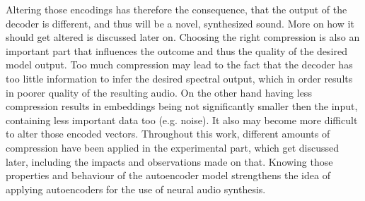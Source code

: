 Altering those encodings has therefore the consequence, that the output of the decoder is different, and thus will be a novel, synthesized sound. More on how it should get altered is discussed later on.
Choosing the right compression is also an important part that influences the outcome and thus the quality of the desired model output. Too much compression may lead to the fact that the decoder has too little information to infer the desired spectral output, which in order results in poorer quality of the resulting audio. On the other hand having less compression results in embeddings being not significantly smaller then the input, containing less important data too (e.g. noise). It also may become more difficult to alter those encoded vectors. Throughout this work, different amounts of compression have been applied in the experimental part, which get discussed later, including the impacts and observations made on that. Knowing those properties and behaviour of the autoencoder model strengthens the idea of applying autoencoders for the use of neural audio synthesis.


